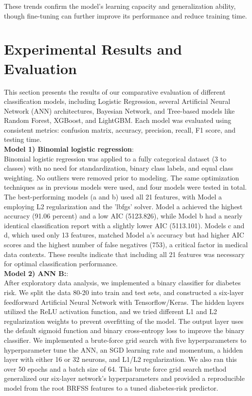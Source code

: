 \documentclass[conference]{IEEEtran}
\begin{document}
These trends confirm the model’s learning capacity and generalization ability, though fine-tuning can further improve its performance and reduce training time.\\

\section{Experimental Results and Evaluation}
This section presents the results of our comparative evaluation of different classification models, including Logistic Regression, several Artificial Neural Network (ANN) architectures, Bayesian Network, and Tree-based models like Random Forest, XGBoost, and LightGBM. Each model was evaluated using consistent metrics: confusion matrix, accuracy, precision, recall, F1 score, and testing time.\\

\noindent
\textbf{Model 1) Binomial logistic regression}:\\
Binomial logistic regression was applied to a fully categorical dataset (3 to classes) with no need for standardization, binary class labels, and equal class weighting. No outliers were removed prior to modeling. The same optimization techniques as in previous models were used, and four models were tested in total. The best-performing models (a and b) used all 21 features, with Model a employing L2 regularization and the 'lbfgs' solver. Model a achieved the highest accuracy (91.06 percent) and a low AIC (5123.826), while Model b had a nearly identical classification report with a slightly lower AIC (5113.101). Models c and d, which used only 13 features, matched Model a’s accuracy but had higher AIC scores and the highest number of false negatives (753), a critical factor in medical data contexts. These results indicate that including all 21 features was necessary for optimal classification performance.\\

\noindent
\textbf{Model 2) ANN B:}:\\
After exploratory data analysis, we implemented a binary classifier for diabetes risk. We split the data 80-20 into train and test sets, and constructed a six-layer feedforward Artificial Neural Network with Tensorflow/Keras. The hidden layers utilized the ReLU activation function, and we tried different L1 and L2 regularization weights to prevent overfitting of the model. The output layer uses the default sigmoid function and binary cross-entropy loss to improve the binary classifier. We implemented a brute-force grid search with five hyperparameters to hyperparameter tune the ANN, an SGD learning rate and momentum, a hidden layer with either 16 or 32 neurons, and L1/L2 regularization. We also ran this over 50 epochs and a batch size of 64.
This brute force grid search method generalized our six-layer network’s hyperparameters and provided a reproducible model from the root BRFSS features to a tuned diabetes‐risk predictor.\\ 
\end{document}
